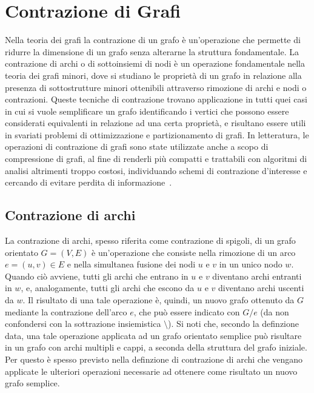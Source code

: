 \section{Contrazione di Grafi}\label{sec:contrazione-di-grafi}

Nella teoria dei grafi la contrazione di un grafo \`e un'operazione che permette di ridurre la dimensione di un grafo
senza alterarne la struttura fondamentale. \newline
La contrazione di archi o di sottoinsiemi di nodi \`e un operazione fondamentale nella teoria dei grafi minori, dove
si studiano le propriet\`a di un grafo in relazione alla presenza di sottostrutture minori ottenibili attraverso
rimozione di archi e nodi o contrazioni. \newline
Queste tecniche di contrazione trovano applicazione in tutti quei casi in cui si vuole semplificare un grafo
identificando i vertici che possono essere considerati equivalenti in relazione ad una certa propriet\`a,
e risultano essere utili in svariati problemi di ottimizzazione e partizionamento di grafi.
In letteratura, le operazioni di contrazione di grafi sono state utilizzate anche a scopo di compressione di grafi,
al fine di renderli pi\`u compatti e trattabili con algoritmi di analisi altrimenti troppo costosi,
individuando schemi di contrazione d'interesse e cercando di evitare perdita di
informazione~\cite{10.1145/3448016.3452797}. \newline


\subsection{Contrazione di archi}\label{subsec:contrazione-di-archi}

La contrazione di archi, spesso riferita come contrazione di spigoli, di un grafo orientato $G = (V, E)$ \`e
un'operazione che consiste nella rimozione di un  arco $e = (u, v) \in E$ e nella simultanea fusione dei nodi $u$ e
$v$ in un unico nodo $w$.
Quando ci\`o avviene, tutti gli archi che entrano in $u$ e $v$ diventano archi entranti in $w$, e, analogamente,
tutti gli archi che escono da $u$ e $v$ diventano archi uscenti da $w$.
Il risultato di una tale operazione \`e, quindi, un nuovo grafo ottenuto da $G$ mediante la contrazione
dell'arco $e$, che pu\`o essere indicato con $G/e$ (da non confondersi con la sottrazione insiemistica $\setminus$).
Si noti che, secondo la definzione data, una tale operazione applicata ad un grafo orientato semplice pu\`o risultare
in un grafo con archi multipli e cappi, a seconda della struttura del grafo iniziale.
Per questo \`e spesso previsto nella definzione di contrazione di archi che vengano applicate le ulteriori operazioni
necessarie ad ottenere come risultato un nuovo grafo semplice.

